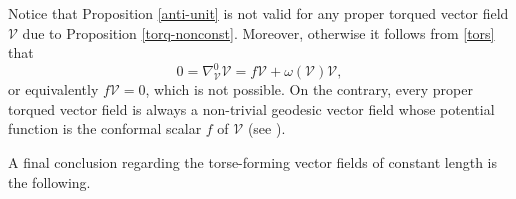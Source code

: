 \documentclass[12pt]{amsart}
\theoremstyle{definition}
\begin{document}



Notice that Proposition \ref{anti-unit} is not valid for any proper torqued vector field $\mathcal{V}$ due to Proposition \ref{torq-nonconst}. Moreover, otherwise it follows from \eqref{tors} that
\begin{equation*}
0=\nabla^0_{\mathcal{V}}\mathcal{V}=f\mathcal{V}+\omega(\mathcal{V})\mathcal{V},    
\end{equation*}
or equivalently $f\mathcal{V}=0$, which is not possible. On the contrary, every proper torqued vector field is always a non-trivial geodesic vector field whose potential function is the conformal scalar $f$ of $\mathcal{V}$ (see  \cite{dmtv}).

A final conclusion regarding the  torse-forming vector fields of constant length is the following.

\end{document}
